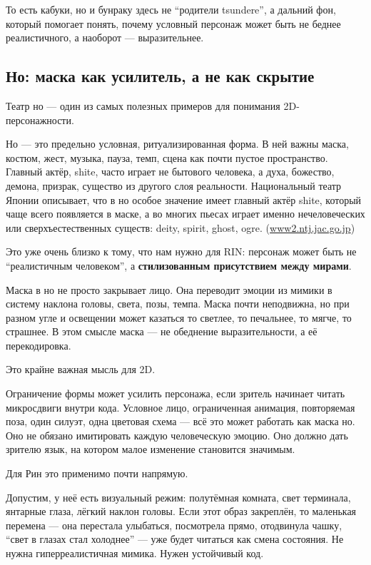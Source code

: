 То есть кабуки, но и бунраку здесь не ``родители tsundere'', а дальний
фон, который помогает понять, почему условный персонаж может быть не
беднее реалистичного, а наоборот --- выразительнее.

\subsection*{Но: маска как усилитель, а не как скрытие}

Театр но --- один из самых полезных примеров для понимания
2D-персонажности.

Но --- это предельно условная, ритуализированная форма. В ней важны
маска, костюм, жест, музыка, пауза, темп, сцена как почти пустое
пространство. Главный актёр, shite, часто играет не бытового человека, а
духа, божество, демона, призрак, существо из другого слоя реальности.
Национальный театр Японии описывает, что в но особое значение имеет
главный актёр shite, который чаще всего появляется в маске, а во многих
пьесах играет именно нечеловеческих или сверхъестественных существ:
deity, spirit, ghost, ogre.
(\href{https://www2.ntj.jac.go.jp/unesco/noh/en/stage/performer1.html?utm_source=chatgpt.com}{www2.ntj.jac.go.jp})

Это уже очень близко к тому, что нам нужно для RIN: персонаж может быть
не ``реалистичным человеком'', а \textbf{стилизованным присутствием
между мирами}.

Маска в но не просто закрывает лицо. Она переводит эмоции из мимики в
систему наклона головы, света, позы, темпа. Маска почти неподвижна, но
при разном угле и освещении может казаться то светлее, то печальнее, то
мягче, то страшнее. В этом смысле маска --- не обеднение
выразительности, а её перекодировка.

Это крайне важная мысль для 2D.

Ограничение формы может усилить персонажа, если зритель начинает читать
микросдвиги внутри кода. Условное лицо, ограниченная анимация,
повторяемая поза, один силуэт, одна цветовая схема --- всё это может
работать как маска но. Оно не обязано имитировать каждую человеческую
эмоцию. Оно должно дать зрителю язык, на котором малое изменение
становится значимым.

Для Рин это применимо почти напрямую.

Допустим, у неё есть визуальный режим: полутёмная комната, свет
терминала, янтарные глаза, лёгкий наклон головы. Если этот образ
закреплён, то маленькая перемена --- она перестала улыбаться, посмотрела
прямо, отодвинула чашку, ``свет в глазах стал холоднее'' --- уже будет
читаться как смена состояния. Не нужна гиперреалистичная мимика. Нужен
устойчивый код.

